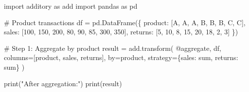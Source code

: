 \documentclass[
  letterpaper,
]{scrbook}
\newenvironment{Shaded}{\begin{snugshade}}{\end{snugshade}}
\newcommand{\BuiltInTok}[1]{\textcolor[rgb]{0.00,0.23,0.31}{#1}}
\newcommand{\CommentTok}[1]{\textcolor[rgb]{0.37,0.37,0.37}{#1}}
\newcommand{\DecValTok}[1]{\textcolor[rgb]{0.68,0.00,0.00}{#1}}
\newcommand{\ImportTok}[1]{\textcolor[rgb]{0.00,0.46,0.62}{#1}}
\newcommand{\NormalTok}[1]{\textcolor[rgb]{0.00,0.23,0.31}{#1}}
\newcommand{\OperatorTok}[1]{\textcolor[rgb]{0.37,0.37,0.37}{#1}}
\newcommand{\StringTok}[1]{\textcolor[rgb]{0.13,0.47,0.30}{#1}}
\begin{document}
\begin{Shaded}
\begin{Highlighting}[]
\ImportTok{import}\NormalTok{ additory }\ImportTok{as}\NormalTok{ add}
\ImportTok{import}\NormalTok{ pandas }\ImportTok{as}\NormalTok{ pd}

\CommentTok{\# Product transactions}
\NormalTok{df }\OperatorTok{=}\NormalTok{ pd.DataFrame(\{}
    \StringTok{\textquotesingle{}product\textquotesingle{}}\NormalTok{: [}\StringTok{\textquotesingle{}A\textquotesingle{}}\NormalTok{, }\StringTok{\textquotesingle{}A\textquotesingle{}}\NormalTok{, }\StringTok{\textquotesingle{}A\textquotesingle{}}\NormalTok{, }\StringTok{\textquotesingle{}B\textquotesingle{}}\NormalTok{, }\StringTok{\textquotesingle{}B\textquotesingle{}}\NormalTok{, }\StringTok{\textquotesingle{}B\textquotesingle{}}\NormalTok{, }\StringTok{\textquotesingle{}C\textquotesingle{}}\NormalTok{, }\StringTok{\textquotesingle{}C\textquotesingle{}}\NormalTok{],}
    \StringTok{\textquotesingle{}sales\textquotesingle{}}\NormalTok{: [}\DecValTok{100}\NormalTok{, }\DecValTok{150}\NormalTok{, }\DecValTok{200}\NormalTok{, }\DecValTok{80}\NormalTok{, }\DecValTok{90}\NormalTok{, }\DecValTok{85}\NormalTok{, }\DecValTok{300}\NormalTok{, }\DecValTok{350}\NormalTok{],}
    \StringTok{\textquotesingle{}returns\textquotesingle{}}\NormalTok{: [}\DecValTok{5}\NormalTok{, }\DecValTok{10}\NormalTok{, }\DecValTok{8}\NormalTok{, }\DecValTok{15}\NormalTok{, }\DecValTok{20}\NormalTok{, }\DecValTok{18}\NormalTok{, }\DecValTok{2}\NormalTok{, }\DecValTok{3}\NormalTok{]}
\NormalTok{\})}

\CommentTok{\# Step 1: Aggregate by product}
\NormalTok{result }\OperatorTok{=}\NormalTok{ add.transform(}
    \StringTok{\textquotesingle{}@aggregate\textquotesingle{}}\NormalTok{,}
\NormalTok{    df,}
\NormalTok{    columns}\OperatorTok{=}\NormalTok{[}\StringTok{\textquotesingle{}product\textquotesingle{}}\NormalTok{, }\StringTok{\textquotesingle{}sales\textquotesingle{}}\NormalTok{, }\StringTok{\textquotesingle{}returns\textquotesingle{}}\NormalTok{],}
\NormalTok{    by}\OperatorTok{=}\StringTok{\textquotesingle{}product\textquotesingle{}}\NormalTok{,}
\NormalTok{    strategy}\OperatorTok{=}\NormalTok{\{}\StringTok{\textquotesingle{}sales\textquotesingle{}}\NormalTok{: }\StringTok{\textquotesingle{}sum\textquotesingle{}}\NormalTok{, }\StringTok{\textquotesingle{}returns\textquotesingle{}}\NormalTok{: }\StringTok{\textquotesingle{}sum\textquotesingle{}}\NormalTok{\}}
\NormalTok{)}

\BuiltInTok{print}\NormalTok{(}\StringTok{"After aggregation:"}\NormalTok{)}
\BuiltInTok{print}\NormalTok{(result)}


\end{Highlighting}
\end{Shaded}
\end{document}
